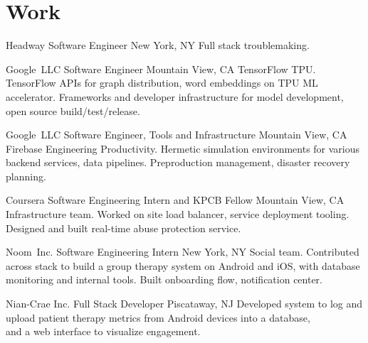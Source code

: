 \documentclass[11pt,letterpaper]{moderncv}
\begin{document}
\maketitle

\section{Work}

        {Headway}
        {Software Engineer}
        {New York, NY}
        {}
        {Full stack troublemaking. \\}

        {Google~LLC}
        {Software Engineer}
        {Mountain View, CA}
        {}
        {TensorFlow TPU. TensorFlow APIs for graph distribution, word embeddings on TPU ML accelerator. Frameworks and developer infrastructure for model development, open source build/test/release. \\}

        {Google~LLC}
        {Software Engineer, Tools and Infrastructure}
        {Mountain View, CA}
        {}
        {Firebase Engineering Productivity. Hermetic simulation environments for various backend services, data pipelines. Preproduction management, disaster recovery planning.\\}

        {Coursera}
        {Software Engineering Intern and KPCB Fellow}
        {Mountain View, CA}
        {}
        {Infrastructure team. Worked on site load balancer, service deployment tooling. \\Designed and built real-time abuse protection service. \\}

        {Noom~Inc.}
        {Software Engineering Intern}
        {New York, NY}
        {}
        {Social team. Contributed across stack to build a group therapy system on Android and iOS, with database monitoring and internal tools. Built onboarding flow, notification center.\\}

        {Nian-Crae Inc.}
        {Full Stack Developer}
        {Piscataway, NJ}
        {}
        {Developed system to log and upload patient therapy metrics from Android devices into a database,\\and a web interface to visualize engagement.\\}
\end{document}
